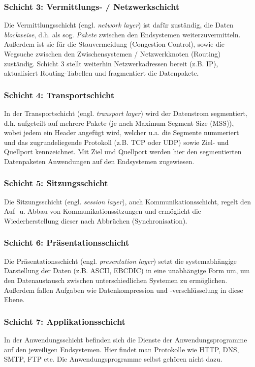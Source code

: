 \subsubsection{Schicht 3: Vermittlungs- / Netzwerkschicht}
Die Vermittlungsschicht (engl. \emph{network layer}) ist dafür zuständig, die Daten \emph{blockweise}, d.h. als sog. \emph{Pakete} zwischen den Endsystemen weiterzuvermitteln. Außerdem ist sie für die Stauvermeidung (Congestion Control), sowie die Wegsuche zwischen den Zwischensystemen / Netzwerkknoten (Routing) zuständig. Schicht 3 stellt weiterhin Netzwerkadressen bereit (z.B. IP), aktualisiert Routing-Tabellen und fragmentiert die Datenpakete.

\subsubsection{Schicht 4: Transportschicht}
In der Transportschicht (engl. \emph{transport layer}) wird der Datenstrom segmentiert, d.h. aufgeteilt auf mehrere Pakete (je nach Maximum Segment Size (MSS)), wobei jedem ein Header angefügt wird, welcher u.a. die Segmente nummeriert und das zugrundeliegende Protokoll (z.B. TCP oder UDP) sowie Ziel- und Quellport kennzeichnet. Mit Ziel und Quellport werden hier den segmentierten Datenpaketen Anwendungen auf den Endsystemen zugewiesen.

\subsubsection{Schicht 5: Sitzungsschicht}
Die Sitzungsschicht (engl. \emph{session layer}), auch Kommunikationsschicht, regelt den Auf- u. Abbau von Kommunikationssitzungen und ermöglicht die Wiederherstellung dieser nach Abbrüchen (Synchronisation).

\subsubsection{Schicht 6: Präsentationsschicht}
Die Präsentationsschicht (engl. \emph{presentation layer}) setzt die systemabhängige Darstellung der Daten (z.B. \textsc{ASCII}, \textsc{EBCDIC}) in eine unabhängige Form um, um den Datenaustausch zwischen unterschiedlichen Systemen zu ermöglichen. Außerdem fallen Aufgaben wie Datenkompression und -verschlüsselung in diese Ebene.

\subsubsection{Schicht 7: Applikationsschicht}
In der Anwendungsschicht befinden sich die Dienste der Anwendungsprogramme auf den jeweiligen Endsystemen. Hier findet man Protokolle wie HTTP, DNS, SMTP, FTP etc. Die Anwendungsprogramme selbst gehören nicht dazu.

